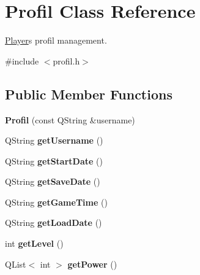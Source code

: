 \hypertarget{class_profil}{}\section{Profil Class Reference}
\label{class_profil}


\hyperlink{class_player}{Player}\textquotesingle{}s profil management.  




{\ttfamily \#include $<$profil.\+h$>$}

\subsection*{Public Member Functions}
\begin{DoxyCompactItemize}
\item 
\hypertarget{class_profil_ad874b5e5885c947739f7dfa8a8932442}{}{\bfseries Profil} (const Q\+String \&username)\label{class_profil_ad874b5e5885c947739f7dfa8a8932442}

\item 
\hypertarget{class_profil_af0ab359fbf8feb7e703293c9025e8d36}{}Q\+String {\bfseries get\+Username} ()\label{class_profil_af0ab359fbf8feb7e703293c9025e8d36}

\item 
\hypertarget{class_profil_aa51ac79c413e575f32166eac7694c313}{}Q\+String {\bfseries get\+Start\+Date} ()\label{class_profil_aa51ac79c413e575f32166eac7694c313}

\item 
\hypertarget{class_profil_a9858f08dfaff3155450e2f2a66ae50cf}{}Q\+String {\bfseries get\+Save\+Date} ()\label{class_profil_a9858f08dfaff3155450e2f2a66ae50cf}

\item 
\hypertarget{class_profil_a8c75d1768cb705d48d8d1f0519512e55}{}Q\+String {\bfseries get\+Game\+Time} ()\label{class_profil_a8c75d1768cb705d48d8d1f0519512e55}

\item 
\hypertarget{class_profil_a9755d065b6f920862fdf642af15c7a7d}{}Q\+String {\bfseries get\+Load\+Date} ()\label{class_profil_a9755d065b6f920862fdf642af15c7a7d}

\item 
\hypertarget{class_profil_a5fd30de19283f6ae22a7232dd22e2afa}{}int {\bfseries get\+Level} ()\label{class_profil_a5fd30de19283f6ae22a7232dd22e2afa}

\item 
\hypertarget{class_profil_aea2c7ddbba5567c777b37293f5fa2aaa}{}Q\+List$<$ int $>$ {\bfseries get\+Power} ()\label{class_profil_aea2c7ddbba5567c777b37293f5fa2aaa}


\end{DoxyCompactItemize}
